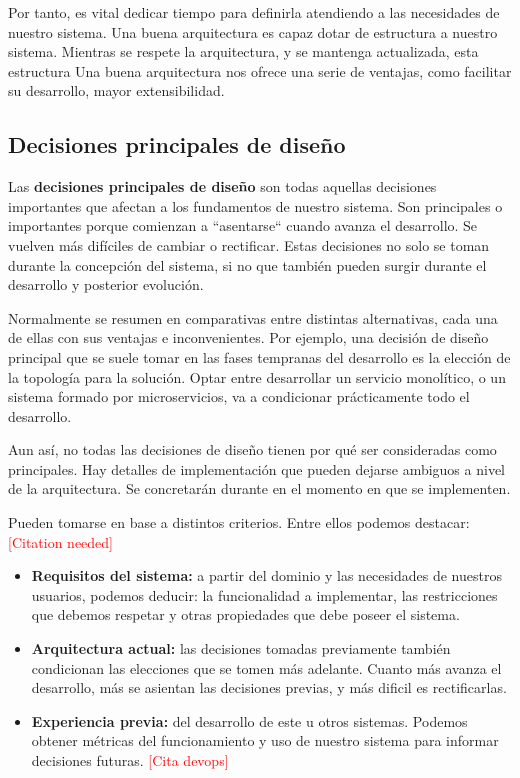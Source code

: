 Por tanto, es vital dedicar tiempo para definirla atendiendo a las necesidades de nuestro sistema. Una buena arquitectura es capaz dotar de estructura a nuestro sistema. \cite{martinCleanArchitectureCraftsman2018} Mientras se respete la arquitectura, y se mantenga actualizada, esta estructura Una buena arquitectura nos ofrece una serie de ventajas, como facilitar su desarrollo, mayor extensibilidad.

\subsection{Decisiones principales de diseño}

Las \textbf{decisiones principales de diseño} son todas aquellas decisiones importantes que afectan a los fundamentos de nuestro sistema. Son principales o importantes porque comienzan a ``asentarse`` cuando avanza el desarrollo. Se vuelven más difíciles de cambiar o rectificar. \cite{taylorSoftwareArchitectureFoundations2009} Estas decisiones no solo se toman durante la concepción del sistema, si no que también pueden surgir durante el desarrollo y posterior evolución.

Normalmente se resumen en comparativas entre distintas alternativas, cada una de ellas con sus ventajas e inconvenientes. Por ejemplo, una decisión de diseño principal que se suele tomar en las fases tempranas del desarrollo es la elección de la topología para la solución. Optar entre desarrollar un servicio monolítico, o un sistema formado por microservicios, va a condicionar prácticamente todo el desarrollo.

Aun así, no todas las decisiones de diseño tienen por qué ser consideradas como principales. Hay detalles de implementación que pueden dejarse ambiguos a nivel de la arquitectura. Se concretarán durante en el momento en que se implementen.

 Pueden tomarse en base a distintos criterios. Entre ellos podemos destacar: \textcolor{red}{[Citation needed]}

    \begin{itemize}
        \item \textbf{Requisitos del sistema:} a partir del dominio y las necesidades de nuestros usuarios, podemos deducir: la funcionalidad a implementar, las restricciones que debemos respetar y otras propiedades que debe poseer el sistema.

        \item \textbf{Arquitectura actual:} las decisiones tomadas previamente también condicionan las elecciones que se tomen más adelante. Cuanto más avanza el desarrollo, más se asientan las decisiones previas, y más dificil es rectificarlas.

        \item \textbf{Experiencia previa:} del desarrollo de este u otros sistemas. Podemos obtener métricas del funcionamiento y uso de nuestro sistema para informar decisiones futuras. \textcolor{red}{[Cita devops]}
    \end{itemize}

